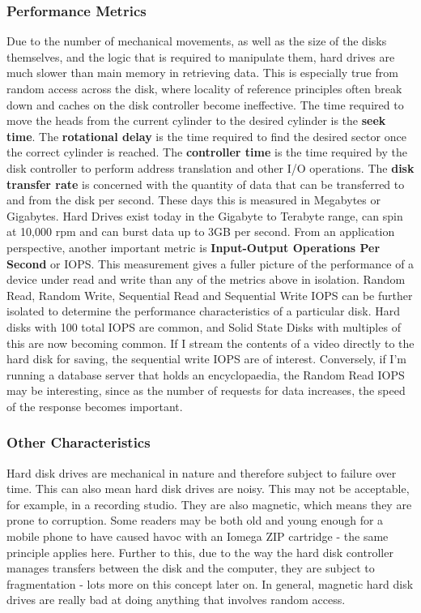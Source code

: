 \documentclass[10pt,a4paper]{article}
\begin{document}
\subsubsection{Performance Metrics}
Due to the number of mechanical movements, as well as the size of the disks themselves, and the logic that is required to manipulate them, hard drives are much slower than main memory in retrieving data. This is especially true from random access across the disk, where locality of reference principles often break down and caches on the disk controller become ineffective. \newline\newline The time required to move the heads from the current cylinder to the desired cylinder is the {\bf seek time}. The {\bf rotational delay} is the time required to find the desired sector once the correct cylinder is reached. The {\bf controller time} is the time required by the disk controller to perform address translation and other I/O operations. The {\bf disk transfer rate} is concerned with the quantity of data that can be transferred to and from the disk per second. These days this is measured in Megabytes or Gigabytes. Hard Drives exist today in the Gigabyte to Terabyte range, can spin at 10,000 rpm and can burst data up to 3GB per second. \newline\newline
From an application perspective, another important metric is {\bf Input-Output Operations Per Second} or IOPS. This measurement gives a fuller picture of the performance of a device under read and write than any of the metrics above in isolation. Random Read, Random Write, Sequential Read and Sequential Write IOPS can be further isolated to determine the performance characteristics of a particular disk. Hard disks with 100 total IOPS are common, and Solid State Disks with multiples of this are now becoming common. If I stream the contents of a video directly to the hard disk for saving, the sequential write IOPS are of interest. Conversely, if I'm running a database server that holds an encyclopaedia, the Random Read IOPS may be interesting, since as the number of requests for data increases, the speed of the response becomes important. 
\subsubsection{Other Characteristics}
Hard disk drives are mechanical in nature and therefore subject to failure over time. This can also mean hard disk drives are noisy. This may not be acceptable, for example, in a recording studio. They are also magnetic, which means they are prone to corruption. Some readers may be both old and young enough for a mobile phone to have caused havoc with an Iomega ZIP cartridge - the same principle applies here. Further to this, due to the way the hard disk controller manages transfers between the disk and the computer, they are subject to fragmentation - lots more on this concept later on. In general, magnetic hard disk drives are really bad at doing anything that involves random access. 
\end{document}
